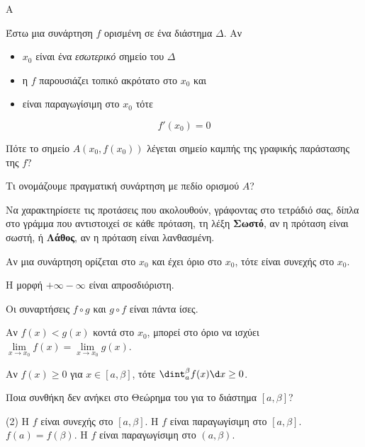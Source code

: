 \begin{thema}{A}
\begin{erwthma}
    \item Έστω μια συνάρτηση $ f $ ορισμένη σε ένα διάστημα $ \varDelta $. Αν \begin{itemize} \item $ x_0 $ είναι ένα \textit{εσωτερικό} σημείο του $ \varDelta $ \item η $ f $ παρουσιάζει τοπικό ακρότατο στο $ x_0 $ και \item είναι παραγωγίσιμη στο $ x_0 $ τότε \end{itemize} \[ f'(x_0)=0 \]
    \item Πότε το σημείο $A(x_0, f(x_0))$ λέγεται σημείο καμπής της γραφικής παράστασης της $f$?
    \item Τι ονομάζουμε πραγματική συνάρτηση με πεδίο ορισμού $A$?
    \item Να χαρακτηρίσετε τις προτάσεις που ακολουθούν, γράφοντας στο τετράδιό σας, δίπλα στο γράμμα που αντιστοιχεί σε κάθε πρόταση, τη λέξη \textbf{Σωστό}, αν η πρόταση είναι σωστή, ή \textbf{Λάθος}, αν η πρόταση είναι λανθασμένη.
    \begin{alist}
        \item Αν μια συνάρτηση ορίζεται στο $x_0$ και έχει όριο στο $x_0$, τότε είναι συνεχής στο $x_0$.
        \item Η μορφή $+\infty - \infty$ είναι απροσδιόριστη.
        \item Οι συναρτήσεις $f\circ g$ και $g\circ f$ είναι πάντα ίσες.
        \item Αν $f(x)<g(x)$ κοντά στο $x_0$, μπορεί στο όριο να ισχύει $\lim\limits_{x\to x_0} f(x) = \lim\limits_{x\to x_0} g(x)$.
        \item Αν $f(x) \ge 0$ για $x \in [a, \beta]$, τότε $\dint_a^\beta f(x) \d x \ge 0$.
    \end{alist}
    \item Ποια συνθήκη δεν ανήκει στο Θεώρημα του  για το διάστημα $[a, \beta]$?
    \begin{tasks}[label=\let\textdexiakeraia\relax\alph*.](2)
        \task H $f$ είναι συνεχής στο $[a, \beta]$.
        \task H $f$ είναι παραγωγίσιμη στο $[a, \beta]$.
        \task $f(a) = f(\beta)$.
        \task H $f$ είναι παραγωγίσιμη στο $(a, \beta)$.
    \end{tasks}
\end{erwthma}
\end{thema}


